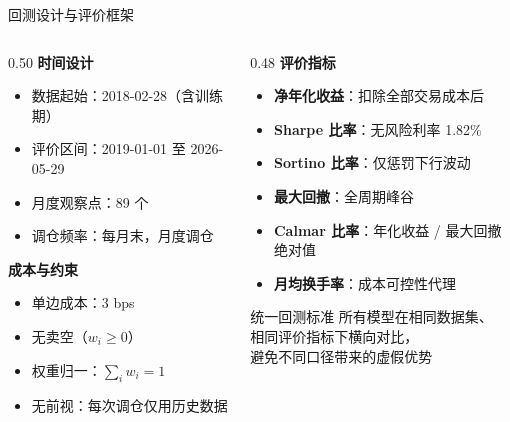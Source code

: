 \documentclass[aspectratio=169,11pt]{beamer}
\newcommand{\evalStartDate}{2019-01-01}
\newcommand{\evalEndDate}{2026-05-29}
\newcommand{\evalMonths}{89}
\newcommand{\txCostBps}{3}
\newcommand{\riskFreeRate}{1.82\%}
\newcommand{\dataFirstDate}{2018-02-28}
\begin{document}
\begin{frame}{回测设计与评价框架}
  \begin{columns}[T]
    \begin{column}{0.50\textwidth}
      \textbf{时间设计}
      \begin{itemize}
        \item 数据起始：\dataFirstDate（含训练期）
        \item 评价区间：\evalStartDate{} 至 \evalEndDate
        \item 月度观察点：\evalMonths{} 个
        \item 调仓频率：每月末，月度调仓
      \end{itemize}
      \vspace{0.5em}
      \textbf{成本与约束}
      \begin{itemize}
        \item 单边成本：\txCostBps{} bps
        \item 无卖空（$w_i \geq 0$）
        \item 权重归一：$\sum_i w_i = 1$
        \item 无前视：每次调仓仅用历史数据
      \end{itemize}
    \end{column}
    \begin{column}{0.48\textwidth}
      \textbf{评价指标}
      \begin{itemize}
        \item \textbf{净年化收益}：扣除全部交易成本后
        \item \textbf{Sharpe 比率}：无风险利率 \riskFreeRate
        \item \textbf{Sortino 比率}：仅惩罚下行波动
        \item \textbf{最大回撤}：全周期峰谷
        \item \textbf{Calmar 比率}：年化收益 / 最大回撤绝对值
        \item \textbf{月均换手率}：成本可控性代理
      \end{itemize}
      \vspace{0.4em}
      \begin{block}{统一回测标准}
        所有模型在相同数据集、\\
        相同评价指标下横向对比，\\
        避免不同口径带来的虚假优势
      \end{block}
    \end{column}
  \end{columns}
\end{frame}
\end{document}
